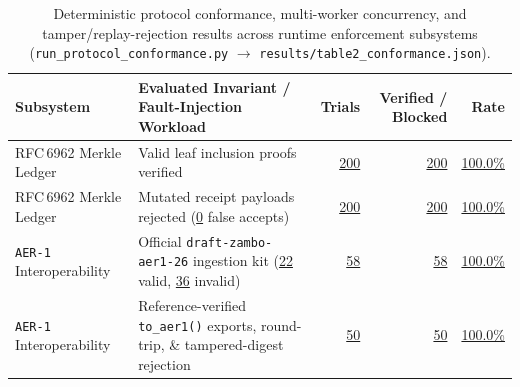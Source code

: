 \documentclass[10pt,twocolumn]{article}
\begin{document}
\begin{table}[t]
\centering
\caption{Deterministic protocol conformance, multi-worker concurrency, and tamper/replay-rejection results across runtime enforcement subsystems (\texttt{run\_protocol\_conformance.py} $\rightarrow$ \texttt{results/table2\_conformance.json}).}
\label{tab:conformance}
\footnotesize
\begin{tabularx}{\textwidth}{@{}l>{\raggedright\arraybackslash}Xrrr@{}}
\toprule
\textbf{Subsystem} & \textbf{Evaluated Invariant / Fault-Injection Workload} & \textbf{Trials} & \textbf{Verified / Blocked} & \textbf{Rate} \\
\midrule
RFC\,6962 Merkle Ledger & Valid leaf inclusion proofs verified & \href{https://github.com/AlienatedAliens/epistemic-guard/blob/v0.5.2/results/table2_conformance.json\#L43}{200} & \href{https://github.com/AlienatedAliens/epistemic-guard/blob/v0.5.2/results/table2_conformance.json\#L47}{200} & \href{https://github.com/AlienatedAliens/epistemic-guard/blob/v0.5.2/results/table2_conformance.json\#L46}{100.0\%} \\
RFC\,6962 Merkle Ledger & Mutated receipt payloads rejected (\href{https://github.com/AlienatedAliens/epistemic-guard/blob/v0.5.2/results/table2_conformance.json\#L42}{0} false accepts) & \href{https://github.com/AlienatedAliens/epistemic-guard/blob/v0.5.2/results/table2_conformance.json\#L43}{200} & \href{https://github.com/AlienatedAliens/epistemic-guard/blob/v0.5.2/results/table2_conformance.json\#L45}{200} & \href{https://github.com/AlienatedAliens/epistemic-guard/blob/v0.5.2/results/table2_conformance.json\#L44}{100.0\%} \\
\texttt{AER-1} Interoperability & Official \texttt{draft-zambo-aer1-26} ingestion kit (\href{https://github.com/AlienatedAliens/epistemic-guard/blob/v0.5.2/results/table2_conformance.json\#L19}{22} valid, \href{https://github.com/AlienatedAliens/epistemic-guard/blob/v0.5.2/results/table2_conformance.json\#L16}{36} invalid) & \href{https://github.com/AlienatedAliens/epistemic-guard/blob/v0.5.2/results/table2_conformance.json\#L21}{58} & \href{https://github.com/AlienatedAliens/epistemic-guard/blob/v0.5.2/results/table2_conformance.json\#L18}{58} & \href{https://github.com/AlienatedAliens/epistemic-guard/blob/v0.5.2/results/table2_conformance.json\#L15}{100.0\%} \\
\texttt{AER-1} Interoperability & Reference-verified \texttt{to\_aer1()} exports, round-trip, \& tampered-digest rejection & \href{https://github.com/AlienatedAliens/epistemic-guard/blob/v0.5.2/results/table2_conformance.json\#L14}{50} & \href{https://github.com/AlienatedAliens/epistemic-guard/blob/v0.5.2/results/table2_conformance.json\#L22}{50} & \href{https://github.com/AlienatedAliens/epistemic-guard/blob/v0.5.2/results/table2_conformance.json\#L23}{100.0\%} \\

\end{tabularx}
\end{table}
\end{document}
